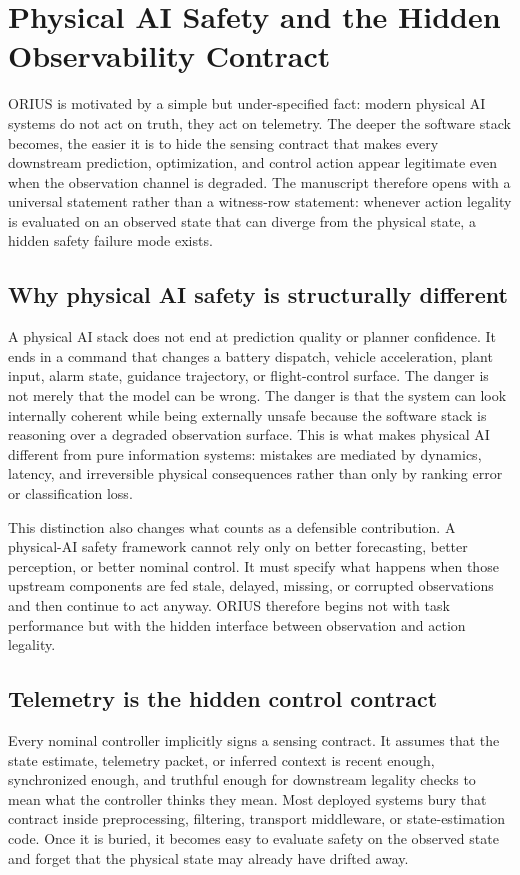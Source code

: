 \chapter{Physical AI Safety and the Hidden Observability Contract}
\label{ch:physical-ai-safety}
ORIUS is motivated by a simple but under-specified fact: modern physical AI systems
do not act on truth, they act on telemetry.  The deeper the software stack becomes,
the easier it is to hide the sensing contract that makes every downstream prediction,
optimization, and control action appear legitimate even when the observation channel is
degraded.  The manuscript therefore opens with a universal statement rather than a
witness-row statement: whenever action legality is evaluated on an observed state that
can diverge from the physical state, a hidden safety failure mode exists.

\section{Why physical AI safety is structurally different}
A physical AI stack does not end at prediction quality or planner confidence.  It ends
in a command that changes a battery dispatch, vehicle acceleration, plant input, alarm
state, guidance trajectory, or flight-control surface.  The danger is not merely that
the model can be wrong.  The danger is that the system can look internally coherent
while being externally unsafe because the software stack is reasoning over a degraded
observation surface.  This is what makes physical AI different from pure information
systems: mistakes are mediated by dynamics, latency, and irreversible physical
consequences rather than only by ranking error or classification loss.

This distinction also changes what counts as a defensible contribution.  A physical-AI
safety framework cannot rely only on better forecasting, better perception, or better
nominal control.  It must specify what happens when those upstream components are fed
stale, delayed, missing, or corrupted observations and then continue to act anyway.
ORIUS therefore begins not with task performance but with the hidden interface between
observation and action legality.

\section{Telemetry is the hidden control contract}
Every nominal controller implicitly signs a sensing contract.  It assumes that the state
estimate, telemetry packet, or inferred context is recent enough, synchronized enough,
and truthful enough for downstream legality checks to mean what the controller thinks
they mean.  Most deployed systems bury that contract inside preprocessing, filtering,
transport middleware, or state-estimation code.  Once it is buried, it becomes easy to
evaluate safety on the observed state and forget that the physical state may already have
drifted away.

